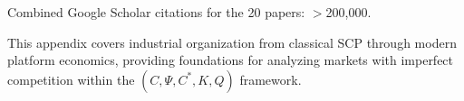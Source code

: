 Combined Google Scholar citations for the 20 papers: $>$200,000.

This appendix covers industrial organization from classical SCP through 
modern platform economics, providing foundations for analyzing markets 
with imperfect competition within the $(C, \Psi, C^*, K, Q)$ framework.

